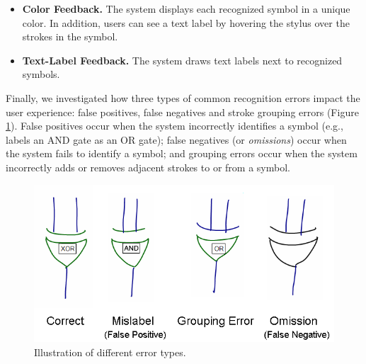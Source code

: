 \documentclass{egpubl}
\begin{document}
\begin{itemize}
\item \textbf{Color Feedback.} The system displays each recognized
symbol in a unique color.  In addition, users can see a text label by
hovering the stylus over the strokes in the symbol.  
\item \textbf{Text-Label Feedback.}  The system draws text labels next
to recognized symbols.
\end{itemize}




Finally, we investigated how three types of common recognition errors
impact the user experience: false positives, false negatives and
stroke grouping errors (Figure \ref{fig:errorDemo}).  False positives
occur when the system incorrectly identifies a symbol (e.g., labels an
AND gate as an OR gate); false negatives (or \textit{omissions}) occur
when the system fails to identify a symbol; and grouping errors occur
when the system incorrectly adds or removes adjacent strokes to or
from a symbol.


\begin{figure}[tb]
  \centering
  \includegraphics{errorDemo.png}
  \caption{\label{fig:errorDemo}
           Illustration of different error types.}
\end{figure}
\end{document}

